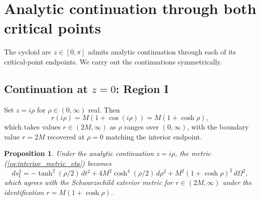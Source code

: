 \documentclass[11pt,a4paper]{article}
\newtheorem{proposition}[theorem]{Proposition}
\theoremstyle{definition}
\begin{document}
\section{Analytic continuation through both critical points}\label{sec:continuation}

The cycloid arc $z \in [0,\pi]$ admits analytic continuation through each of its critical-point endpoints. We carry out the continuations symmetrically.

\subsection{Continuation at \texorpdfstring{$z=0$}{z=0}: Region I}

Set $z = i\rho$ for $\rho \in (0, \infty)$ real. Then
\begin{equation}\label{eq:r_RegionI}
r(i\rho) = M(1 + \cos(i\rho)) = M(1 + \cosh\rho),
\end{equation}
which takes values $r \in (2M, \infty)$ as $\rho$ ranges over $(0, \infty)$, with the boundary value $r = 2M$ recovered at $\rho = 0$ matching the interior endpoint.

\begin{proposition}\label{prop:region_I_metric}
Under the analytic continuation $z = i\rho$, the metric (\ref{eq:interior_metric_eta}) becomes
\begin{equation}\label{eq:Region_I_metric}
ds^2_{\text{I}} = -\tanh^2(\rho/2)\, dt^2 + 4M^2 \cosh^4(\rho/2)\, d\rho^2 + M^2(1 + \cosh\rho)^2\, d\Omega^2,
\end{equation}
which agrees with the Schwarzschild exterior metric for $r \in (2M, \infty)$ under the identification $r = M(1+\cosh\rho)$.
\end{proposition}
\end{document}
